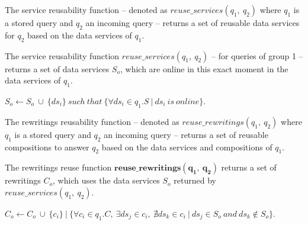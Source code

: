 The service reusability function -- denoted as $reuse\_services(q_{1},\ q_{2})$ where $q_{1}$ is a stored query and $q_{2}$ an incoming query -- returns a set of reusable data services for $q_{2}$ based on the data services of $q_{1}$.

\begin{definition}\label{def:rsqt1}
The service reusability function $reuse\_services(q_{1},\ q_{2})$ -- for queries of group 1 -- returns a set of data services $S_{o}$, which are online in this exact moment in the data services of $q_{1}$. 
\begin{center}
$ S_{o} \leftarrow S_{o} \ \cup \ \lbrace ds_{i} \rbrace\ such\ that\ \lbrace \forall ds_{i} \in q_{1}.S \ \vert \ ds_{i} \ is \ online\rbrace$.
\end{center}
\end{definition}

The rewritings reusability function -- denoted as $reuse\_rewritings(q_{1},\ q_{2})$ where $q_{1}$ is a stored query and $q_{2}$ an incoming query -- returns a set of reusable compositions to answer $q_{2}$ based on the data services and compositions of $q_{1}$.

\begin{definition}\label{def:rrqt1}
The rewritings reuse function $\mathbf{reuse\_rewritings(q_{1},\ q_{2})}$ returns a set of rewritings $C_{o}$, which uses the data services $S_{o}$ returned by $reuse\_services(q_{1},\ q_{2})$. 
\begin{center}
$C_{o} \leftarrow C_{o} \ \cup \ \lbrace c_{i} \rbrace\ \vert\ \lbrace \forall c_{i} \in q_{1}.C,\ \exists ds_{j} \in c_{i},\ \nexists ds_{k} \in c_{i} \ \vert \
   ds_{j} \in S_{o} \ and \ ds_{k} \notin S_{o} \rbrace$.
\end{center}
\end{definition}

